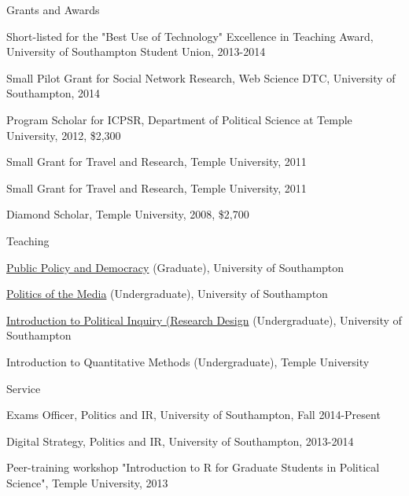 \documentclass{resume} %
\begin{document}
\begin{rSection}{Grants and Awards}

\item Short-listed for the "Best Use of Technology" Excellence in Teaching Award, University of Southampton Student Union, 2013-2014    
\item Small Pilot Grant for Social Network Research, Web Science DTC, University of Southampton, 2014     
\item Program Scholar for ICPSR, Department of Political Science at Temple University, 2012, \$2,300    
\item Small Grant for Travel and Research, Temple University, 2011    
\item Small Grant for Travel and Research, Temple University, 2011   
\item Diamond Scholar, Temple University, 2008, \$2,700    

\end{rSection}



\begin{rSection}{Teaching}
\item \href{http://jmrphy.net/course\_public\_policy}{Public Policy and Democracy} (Graduate), University of Southampton           
\item \href{http://jmrphy.net/course\_media\_politics}{Politics of the Media} (Undergraduate), University of Southampton     
\item \href{http://jmrphy.net/political_inquiry}{Introduction to Political Inquiry (Research Design} (Undergraduate), University of Southampton       
\item Introduction to Quantitative Methods (Undergraduate), Temple University               
\end{rSection}


\begin{rSection}{Service}
\item Exams Officer, Politics and IR, University of Southampton, Fall 2014-Present        
\item Digital Strategy, Politics and IR, University of Southampton, 2013-2014        
\item Peer-training workshop "Introduction to R for Graduate Students in Political Science", Temple University, 2013         
\end{rSection}
\end{document}
